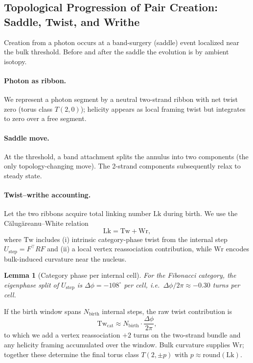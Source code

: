 \documentclass[11pt]{article}
\theoremstyle{plain}
\newtheorem{lemma}[theorem]{Lemma}
\theoremstyle{definition}
\begin{document}
\subsection{Topological Progression of Pair Creation: Saddle, Twist, and Writhe}\label{subsec:topological-movie}

Creation from a photon occurs at a band-surgery (saddle) event localized near the bulk threshold. Before and after the saddle the evolution is by ambient isotopy.

\paragraph{Photon as ribbon.}
We represent a photon segment by a neutral two-strand ribbon with net twist zero (torus class $T(2,0)$); helicity appears as local framing twist but integrates to zero over a free segment.

\paragraph{Saddle move.}
At the threshold, a band attachment splits the annulus into two components (the only topology-changing move). The 2-strand components subsequently relax to steady state.

\paragraph{Twist–writhe accounting.}
Let the two ribbons acquire total linking number $\mathrm{Lk}$ during birth. We use the Călugăreanu–White relation
\begin{equation}
  \mathrm{Lk}=\mathrm{Tw}+\mathrm{Wr},
\end{equation}
where $\mathrm{Tw}$ includes (i) intrinsic category-phase twist from the internal step $U_{\mathrm{step}}=F^\top R F$ and (ii) a local vertex reassociation contribution, while $\mathrm{Wr}$ encodes bulk-induced curvature near the nucleus.

\begin{lemma}[Category phase per internal cell]\label{lem:phase-per-cell}
  For the Fibonacci category, the eigenphase split of $U_{\mathrm{step}}$ is $\Delta\phi=-108^\circ$ per cell, i.e.\ $\Delta\phi/2\pi\approx -0.30$ turns per cell.
\end{lemma}

If the birth window spans $N_{\mathrm{birth}}$ internal steps, the raw twist contribution is
\begin{equation}
  \mathrm{Tw}_{\mathrm{cat}}\approx N_{\mathrm{birth}}\cdot \frac{\Delta\phi}{2\pi},
\end{equation}
to which we add a vertex reassociation $+2$ turns on the two-strand bundle and any helicity framing accumulated over the window. Bulk curvature supplies $\mathrm{Wr}$; together these determine the final torus class $T(2,\pm p)$ with $p\approx \mathrm{round}(\mathrm{Lk})$.
\end{document}

